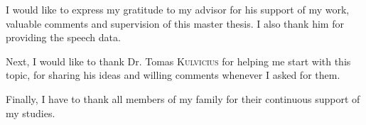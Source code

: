 
\begin{acknowledgements}
\vspace{1cm}
I would like to express my gratitude to my advisor \mbox{\supname} for his support of my work, valuable comments and supervision of this master thesis. I also thank him for providing the speech data.

Next, I would like to thank Dr. Tomas \textsc{Kulvicius} for helping me start with this topic, for sharing his ideas and willing comments whenever I asked for them.

Finally, I have to thank all members of my family for their continuous \mbox{support} of my studies.

\end{acknowledgements}